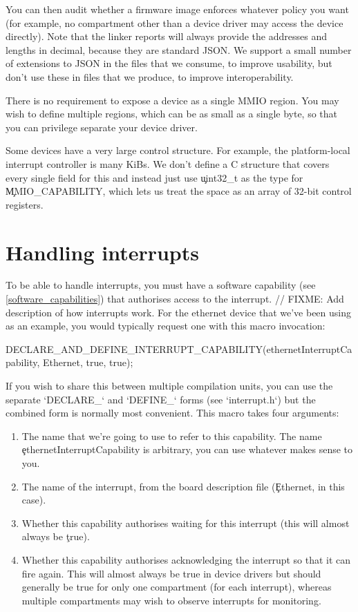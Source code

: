 You can then audit whether a firmware image enforces whatever policy you want (for example, no compartment other than a device driver may access the device directly).
Note that the linker reports will always provide the addresses and lengths in decimal, because they are standard JSON.
We support a small number of extensions to JSON in the files that we consume, to improve usability, but don't use these in files that we produce, to improve interoperability.

There is no requirement to expose a device as a single MMIO region.
You may wish to define multiple regions, which can be as small as a single byte, so that you can privilege separate your device driver.

Some devices have a very large control structure.
For example, the platform-local interrupt controller is many KiBs.
We don't define a C structure that covers every single field for this and instead just use \c{uint32_t} as the type for \c{MMIO_CAPABILITY}, which lets us treat the space as an array of 32-bit control registers.

\section{Handling interrupts}

To be able to handle interrupts, you must have a software capability (see \ref{software_capabilities}) that authorises access to the interrupt.
// FIXME: Add description of how interrupts work.
For the ethernet device that we've been using as an example, you would typically request one with this macro invocation:

\begin{cxxsnippet}
DECLARE_AND_DEFINE_INTERRUPT_CAPABILITY(ethernetInterruptCapability, Ethernet, true, true);
\end{cxxsnippet}

If you wish to share this between multiple compilation units, you can use the separate `DECLARE_` and `DEFINE_` forms (see `interrupt.h`) but the combined form is normally most convenient.
This macro takes four arguments:

\begin{enumerate}
	\item{The name that we're going to use to refer to this capability.
		The name \c{ethernetInterruptCapability} is arbitrary, you can use whatever makes sense to you.}
	\item{The name of the interrupt, from the board description file (\c{Ethernet}, in this case).}
	\item{Whether this capability authorises waiting for this interrupt (this will almost always be \c{true}).}
\item{Whether this capability authorises acknowledging the interrupt so that it can fire again.
	This will almost always be true in device drivers but should generally be true for only one compartment (for each interrupt), whereas multiple compartments may wish to observe interrupts for monitoring.}
\end{enumerate}

